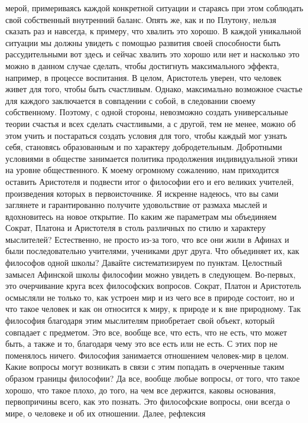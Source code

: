 мерой, примериваясь каждой конкретной ситуации и стараясь при этом соблюдать
свой собственный внутренний баланс. Опять же, как и по Плутону, нельзя сказать
раз и навсегда, к примеру, что хвалить это хорошо. В каждой уникальной ситуации
мы должны увидеть с помощью развития своей способности быть рассудительными вот
здесь и сейчас хвалить это хорошо или нет и насколько это можно в данном случае
сделать, чтобы достигнуть максимального эффекта, например, в процессе
воспитания. В целом, Аристотель уверен, что человек живет для того, чтобы быть
счастливым. Однако, максимально возможное счастье для каждого заключается в
совпадении с собой, в следовании своему собственному. Поэтому, с одной стороны,
невозможно создать универсальные теории счастья и всех сделать счастливыми, а с
другой, тем не менее, можно об этом учить и постараться создать условия для
того, чтобы каждый мог узнать себя, становясь образованным и по характеру
добродетельным. Добротными условиями в обществе занимается политика продолжения
индивидуальной этики на уровне общественного. К моему огромному сожалению, нам
приходится оставить Аристотеля и подвести итог о философии его и его великих
учителей, произведения которых в первоисточнике. Я искренне надеюсь, что вы сами
заглянете и гарантированно получите удовольствие от размаха мыслей и
вдохновитесь на новое открытие. По каким же параметрам мы объединяем Сократ,
Платона и Аристотеля в столь различных по стилю и характеру мыслителей?
Естественно, не просто из-за того, что все они жили в Афинах и были
последовательно учителями, учениками друг друга. Что объединяет их, как
философов одной школы? Давайте систематизируем по пунктам. Целостный замысел
Афинской школы философии можно увидеть в следующем. Во-первых, это очерчивание
круга всех философских вопросов. Сократ, Платон и Аристотель осмысляли не только
то, как устроен мир и из чего все в природе состоит, но и что такое человек и
как он относится к миру, к природе и к вне природному. Так философия благодаря
этим мыслителям приобретает свой объект, который совпадает с предметом. Это все,
вообще все, что есть, что не есть, что может быть, а также и то, благодаря чему
это все есть или не есть. С этих пор не поменялось ничего. Философия занимается
отношением человек-мир в целом. Какие вопросы могут возникать в связи с этим
попадать в очерченные таким образом границы философии? Да все, вообще любые
вопросы, от того, что такое хорошо, что такое плохо, до того, на чем все
держится, каковы основания, первопричины всего, как это познать. Это философские
вопросы, они всегда о мире, о человеке и об их отношении. Далее, рефлексия
